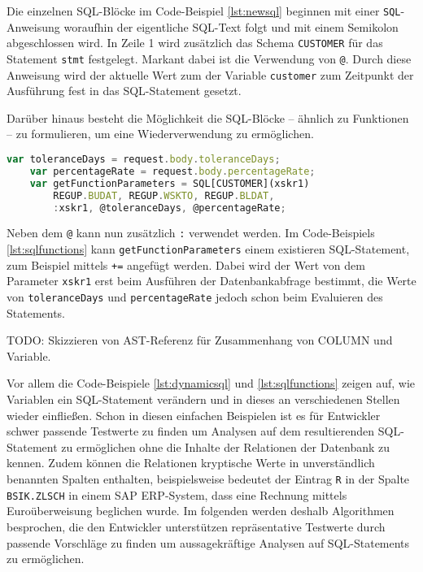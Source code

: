Die einzelnen SQL-Blöcke im Code-Beispiel \ref{lst:newsql} beginnen mit einer \texttt{SQL}-Anweisung woraufhin der eigentliche SQL-Text folgt und mit einem Semikolon abgeschlossen wird.
In Zeile 1 wird zusätzlich das Schema \texttt{CUSTOMER} für das Statement \texttt{stmt} festgelegt.
Markant dabei ist die Verwendung von \texttt{@}.
Durch diese Anweisung wird der aktuelle Wert zum der Variable \texttt{customer} zum Zeitpunkt der Ausführung fest in das SQL-Statement gesetzt.

Darüber hinaus besteht die Möglichkeit die SQL-Blöcke – ähnlich zu Funktionen – zu formulieren, um eine Wiederverwendung zu ermöglichen.

	\begin{lstlisting}[caption={SQL-Blöcke mit Parametern ermöglichen Wiederverwendung.}, label={lst:sqlfunctions}, language=JavaScript]
	var toleranceDays = request.body.toleranceDays;
	var percentageRate = request.body.percentageRate;
	var getFunctionParameters = SQL[CUSTOMER](xskr1)
		REGUP.BUDAT, REGUP.WSKTO, REGUP.BLDAT,
		:xskr1, @toleranceDays, @percentageRate;
	\end{lstlisting}

Neben dem \texttt{@} kann nun zusätzlich \texttt{:} verwendet werden.
Im Code-Beispiels \ref{lst:sqlfunctions} kann \texttt{getFunctionParameters} einem existieren SQL-Statement, zum Beispiel mittels \texttt{+=} angefügt werden.
Dabei wird der Wert von dem Parameter \texttt{xskr1} erst beim Ausführen der Datenbankabfrage bestimmt, die Werte von \texttt{toleranceDays} und \texttt{percentageRate} jedoch schon beim Evaluieren des Statements.

TODO: Skizzieren von AST-Referenz für Zusammenhang von COLUMN und Variable.

Vor allem die Code-Beispiele \ref{lst:dynamicsql} und \ref{lst:sqlfunctions} zeigen auf, wie Variablen ein SQL-Statement verändern und in dieses an verschiedenen Stellen wieder einfließen.
Schon in diesen einfachen Beispielen ist es für Entwickler schwer passende Testwerte zu finden um Analysen auf dem resultierenden SQL-Statement zu ermöglichen ohne die Inhalte der Relationen der Datenbank zu kennen.
Zudem können die Relationen kryptische Werte in unverständlich benannten Spalten enthalten, beispielsweise bedeutet der Eintrag \texttt{R} in der Spalte \texttt{BSIK.ZLSCH} in einem SAP ERP-System, dass eine Rechnung mittels Euroüberweisung beglichen wurde.
Im folgenden werden deshalb Algorithmen besprochen, die den Entwickler unterstützen repräsentative Testwerte durch passende Vorschläge zu finden um aussagekräftige Analysen auf SQL-Statements zu ermöglichen.
